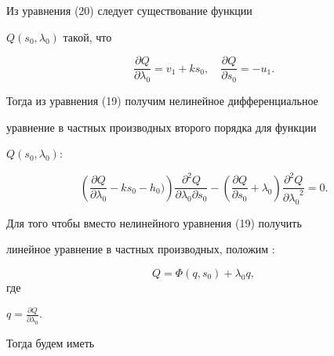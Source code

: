 Из уравнения (20) следует существование функции


$Q(s_0,  \lambda_0)$ такой, что


\[


\frac{\partial Q}{\partial \lambda_0} = v_1 + k s_0,  \quad


\frac{\partial Q}{\partial s_0} = - u_1.


\]


Тогда из уравнения (19) получим нелинейное дифференциальное


уравнение в частных производных второго порядка для функции


$Q(s_0,  \lambda_0)$:


\begin{equation}


\left(\frac{\partial Q}{\partial


\lambda_0} - k s_0-h_0)\right) \frac{{\partial}^2 Q}{\partial


\lambda_0   \partial s_0} -  \left(\frac {\partial Q}{\partial


s_0} + \lambda_0\right) \frac{{\partial}^2 Q}{{\partial


\lambda_0}^2} = 0.


\end{equation}





Для того  чтобы вместо нелинейного уравнения (19) получить


линейное уравнение в частных производных,  положим \cite{Kamke}:


\[


 Q = \Phi(q,  s_0) + \lambda_0 q, \] где


$q = \frac{\partial Q}{\partial \lambda_0}$.


Тогда будем иметь



